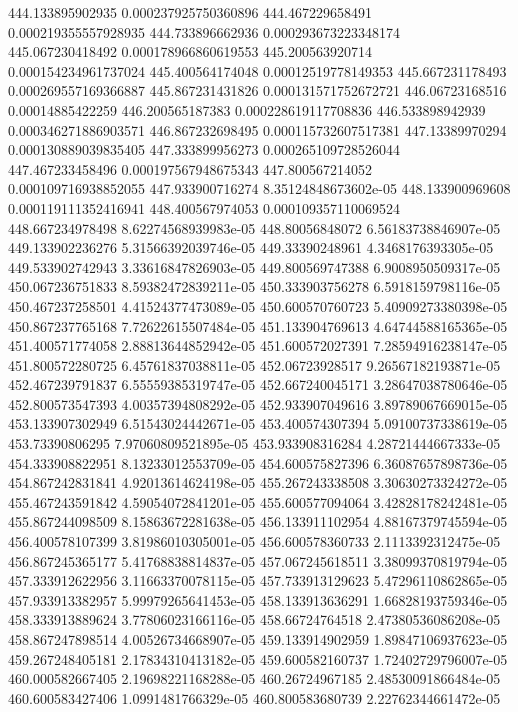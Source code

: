 {444.133895902935 0.000237925750360896
444.467229658491 0.000219355557928935
444.733896662936 0.000293673223348174
445.067230418492 0.000178966860619553
445.200563920714 0.000154234961737024
445.400564174048 0.00012519778149353
445.667231178493 0.000269557169366887
445.867231431826 0.000131571752672721
446.06723168516 0.00014885422259
446.200565187383 0.000228619117708836
446.533898942939 0.000346271886903571
446.867232698495 0.000115732607517381
447.13389970294 0.000130889039835405
447.333899956273 0.000265109728526044
447.467233458496 0.000197567948675343
447.800567214052 0.000109716938852055
447.933900716274 8.35124848673602e-05
448.133900969608 0.000119111352416941
448.400567974053 0.000109357110069524
448.667234978498 8.62274568939983e-05
448.80056848072 6.56183738846907e-05
449.133902236276 5.31566392039746e-05
449.33390248961 4.3468176393305e-05
449.533902742943 3.33616847826903e-05
449.800569747388 6.9008950509317e-05
450.067236751833 8.59382472839211e-05
450.333903756278 6.5918159798116e-05
450.467237258501 4.41524377473089e-05
450.600570760723 5.40909273380398e-05
450.867237765168 7.72622615507484e-05
451.133904769613 4.64744588165365e-05
451.400571774058 2.88813644852942e-05
451.600572027391 7.28594916238147e-05
451.800572280725 6.45761837038811e-05
452.06723928517 9.26567182193871e-05
452.467239791837 6.55559385319747e-05
452.667240045171 3.28647038780646e-05
452.800573547393 4.00357394808292e-05
452.933907049616 3.89789067669015e-05
453.133907302949 6.51543024442671e-05
453.400574307394 5.09100737338619e-05
453.73390806295 7.97060809521895e-05
453.933908316284 4.28721444667333e-05
454.333908822951 8.13233012553709e-05
454.600575827396 6.36087657898736e-05
454.867242831841 4.92013614624198e-05
455.267243338508 3.30630273324272e-05
455.467243591842 4.59054072841201e-05
455.600577094064 3.42828178242481e-05
455.867244098509 8.15863672281638e-05
456.133911102954 4.88167379745594e-05
456.400578107399 3.81986010305001e-05
456.600578360733 2.1113392312475e-05
456.867245365177 5.41768838814837e-05
457.067245618511 3.38099370819794e-05
457.333912622956 3.11663370078115e-05
457.733913129623 5.47296110862865e-05
457.933913382957 5.99979265641453e-05
458.133913636291 1.66828193759346e-05
458.333913889624 3.77806023166116e-05
458.66724764518 2.47380536086208e-05
458.867247898514 4.00526734668907e-05
459.133914902959 1.89847106937623e-05
459.267248405181 2.17834310413182e-05
459.600582160737 1.72402729796007e-05
460.000582667405 2.19698221168288e-05
460.26724967185 2.48530091866484e-05
460.600583427406 1.0991481766329e-05
460.800583680739 2.22762344661472e-05
}
